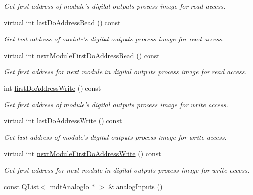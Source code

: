 \begin{DoxyCompactItemize}
\begin{DoxyCompactList}\small\item\em Get first address of module's digital outputs process image for read access. \end{DoxyCompactList}\item 
virtual int \hyperlink{classmdt_device_modbus_wago_module_a842c9dcad712703dfa9e5736a1e3c215}{last\-Do\-Address\-Read} () const 
\begin{DoxyCompactList}\small\item\em Get last address of module's digital outputs process image for read access. \end{DoxyCompactList}\item 
virtual int \hyperlink{classmdt_device_modbus_wago_module_aa2efef403e1f92e8e4a8195d7568b116}{next\-Module\-First\-Do\-Address\-Read} () const 
\begin{DoxyCompactList}\small\item\em Get first address for next module in digital outputs process image for read access. \end{DoxyCompactList}\item 
int \hyperlink{classmdt_device_modbus_wago_module_a31165c5734801029ea530be8774da5de}{first\-Do\-Address\-Write} () const 
\begin{DoxyCompactList}\small\item\em Get first address of module's digital outputs process image for write access. \end{DoxyCompactList}\item 
virtual int \hyperlink{classmdt_device_modbus_wago_module_a32cdbdcebb5b6d00dac2d1aaefff8fb6}{last\-Do\-Address\-Write} () const 
\begin{DoxyCompactList}\small\item\em Get last address of module's digital outputs process image for write access. \end{DoxyCompactList}\item 
virtual int \hyperlink{classmdt_device_modbus_wago_module_a2417c543a08a9804b0ec5b4dc9dfe4cd}{next\-Module\-First\-Do\-Address\-Write} () const 
\begin{DoxyCompactList}\small\item\em Get first address for next module in digital outputs process image for write access. \end{DoxyCompactList}\item 
const Q\-List$<$ \hyperlink{classmdt_analog_io}{mdt\-Analog\-Io} $\ast$ $>$ \& \hyperlink{classmdt_device_modbus_wago_module_a755946efd8ea4ee13d8f6fe4fb6ea05f}{analog\-Inputs} ()

\end{DoxyCompactItemize}

